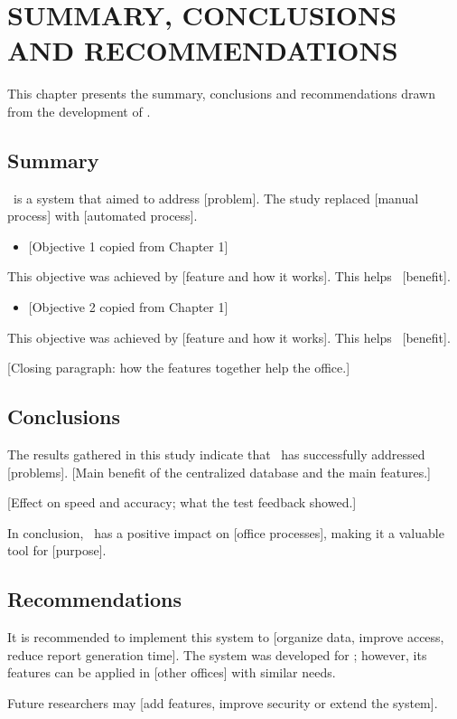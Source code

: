 \chapter{SUMMARY, CONCLUSIONS AND RECOMMENDATIONS}
This chapter presents the summary, conclusions and recommendations drawn from the development of \SystemName.

\section{Summary}
\SystemName\ is a system that aimed to address [problem]. The study replaced [manual process] with [automated process].

\begin{itemize}[leftmargin=0.75in,itemsep=0pt,topsep=3pt]
  \item {[Objective 1 copied from Chapter 1]}
\end{itemize}
This objective was achieved by [feature and how it works]. This helps \OfficeName\ [benefit].

\begin{itemize}[leftmargin=0.75in,itemsep=0pt,topsep=3pt]
  \item {[Objective 2 copied from Chapter 1]}
\end{itemize}
This objective was achieved by [feature and how it works]. This helps \OfficeName\ [benefit].

[Closing paragraph: how the features together help the office.]

\section{Conclusions}
The results gathered in this study indicate that \SystemName\ has successfully addressed [problems]. [Main benefit of the centralized database and the main features.]

[Effect on speed and accuracy; what the test feedback showed.]

In conclusion, \SystemName\ has a positive impact on [office processes], making it a valuable tool for [purpose].

\section{Recommendations}
It is recommended to implement this system to [organize data, improve access, reduce report generation time]. The system was developed for \OfficeName; however, its features can be applied in [other offices] with similar needs.

Future researchers may [add features, improve security or extend the system].
